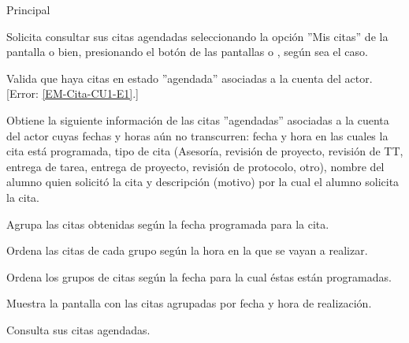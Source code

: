 \begin{UCtrayectoria}{Principal}

	\UCpaso [\UCactor] Solicita consultar sus citas agendadas seleccionando la opción ''Mis citas'' de la pantalla  o bien, presionando el botón  de las pantallas  o , según sea el caso.

	\UCpaso Valida que haya citas en estado ''agendada'' asociadas a la cuenta del actor. [Error: \ref{EM-Cita-CU1-E1}.]

	\UCpaso Obtiene la siguiente información de las citas ''agendadas'' asociadas a la cuenta del actor cuyas fechas y horas aún no transcurren: fecha y hora en las cuales la cita está programada, tipo de cita (Asesoría, revisión de proyecto, revisión de TT, entrega de tarea, entrega de proyecto, revisión de protocolo, otro), nombre del alumno quien solicitó la cita y descripción (motivo) por la cual el alumno solicita la cita.

	\UCpaso Agrupa las citas obtenidas según la fecha programada para la cita.

	\UCpaso Ordena las citas de cada grupo según la hora en la que se vayan a realizar. 

	\UCpaso Ordena los grupos de citas según la fecha para la cual éstas están programadas.

	\UCpaso Muestra la pantalla  con las citas agrupadas por fecha y hora de realización. 

	\UCpaso [\UCactor] Consulta sus citas agendadas. 

\end{UCtrayectoria}

